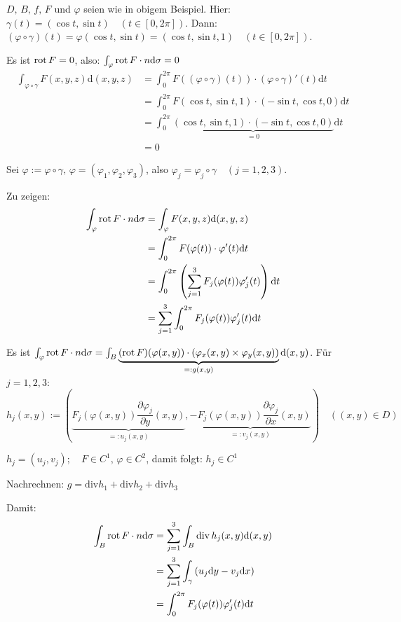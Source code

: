 \begin{beispiel}
\(D,\,B,\,f,\,F\) und \(\varphi\) seien wie in obigem Beispiel.
Hier: \(\gamma(t)=(\cos t,\sin t)\quad(t\in [0,2\pi])\).
Dann: \((\varphi\circ\gamma)(t)=\varphi(\cos t, \sin t)=(\cos t, \sin t, 1)\quad(t\in [0,2\pi])\).

Es ist \(\mathop{\rm rot}\nolimits F=0\), also: \(\int_{\varphi}{\mathop{\rm rot}\nolimits F\cdot n\mathrm{d}\sigma}=0\)
\begin{align*}
\int_{\varphi\circ\gamma}{F(x,y,z)\mathrm{d}(x,y,z)}&=
    \int_{0}^{2\pi}{F((\varphi\circ\gamma)(t))\cdot(\varphi\circ\gamma)'(t)\mathrm{d}t}\\
&=\int_{0}^{2\pi}{F(\cos t,\sin t, 1)\cdot (-\sin t,\cos t,0)\mathrm{d}t}\\
&=\int_{0}^{2\pi}{\underbrace{(\cos t,\sin t,1)\cdot (-\sin t,\cos t,0)}_{=0}\mathrm{d}t}\\
&=0
\end{align*}
\end{beispiel}

\begin{beweis}
Sei \(\varphi:=\varphi\circ\gamma,\,\varphi=(\varphi_{1},\varphi_{2},\varphi_{3})\), also
    \(\varphi_{j}=\varphi_{j}\circ\gamma\quad(j=1,2,3)\).

Zu zeigen:
\begin{align*}
\int_{\varphi}{\mathop{\rm rot}\nolimits F\cdot n\mathrm{d}\sigma}
    &=\int_{\varphi}{F(x,y,z)\mathrm{d}(x,y,z)}\\
    &=\int_{0}^{2\pi}{F(\varphi(t))\cdot\varphi'(t)\mathrm{d}t}\\
    &=\int_{0}^{2\pi}{\left(\sum_{j=1}^{3}{F_{j}(\varphi(t))\varphi_{j}'(t)}\right)\mathrm{d}t}\\
    &=\sum_{j=1}^{3}{\int_{0}^{2\pi}{F_{j}(\varphi(t))\varphi_{j}'(t)\mathrm{d}t}}
\end{align*}

Es ist \(\int_{\varphi}{\mathop{\rm rot}\nolimits F\cdot n\mathrm{d}\sigma}=\int_{B}{\underbrace{(\mathop{\rm rot}\nolimits F)(\varphi(x,y))\cdot(\varphi_{x}(x,y)\times\varphi_{y}(x,y))}_{=:g(x,y)}\mathrm{d}(x,y)}\).
Für \(j=1,2,3\):
\[
h_{j}(x,y):=\left(\underbrace{F_{j}(\varphi(x,y))\frac{\partial\varphi_{j}}{\partial y}(x,y)}_{=:u_{j}(x,y)},\underbrace{-F_{j}(\varphi(x,y))\frac{\partial\varphi_{j}}{\partial x}(x,y)}_{=:v_{j}(x,y)}\right)\quad((x,y)\in D)
\]


\(h_{j}=(u_{j},v_{j});\quad F\in C^{1},\,\varphi\in C^{2}\), damit folgt: \(h_{j}\in C^{1}\)

Nachrechnen: \(g=\mathrm{div} h_{1}+\mathrm{div} h_{2}+\mathrm{div} h_{3}\)

Damit:
\begin{align*}
\int_{B}{\mathop{\rm rot}\nolimits F\cdot n\mathrm{d}\sigma}
    &=\sum_{j=1}^{3}{\int_{B}{\mathrm{div}\,h_{j}(x,y)\mathrm{d}(x,y)}}\\
    &=\sum_{j=1}^{3}{\int_{\gamma}{(u_{j}\mathrm{d}y-v_{j}\mathrm{d}x)}}\\
    &=\int_{0}^{2\pi}{F_{j}(\varphi(t))\varphi_{j}'(t)\mathrm{d}t}
\end{align*}
\end{beweis}
